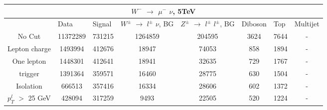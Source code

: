 \documentclass[10pt]{article}
\begin{document}
 										
\begin{center}										
\begin{table}[H] 										
\begin{adjustbox}{width=1\textwidth}								
\begin{tabular}{cccccccc} 									
\\ \hline \hline  										
\multicolumn{8}{c}{$W^{-}$ $\rightarrow$ $\mu^{-}$ $\nu$, 5TeV}  									
\\ \hline \hline                            						
\multicolumn{1}{|c|}{}   & \multicolumn{1}{l|}{Data} & \multicolumn{1}{l|}{Signal} & \multicolumn{1}{l|}{$W^{\pm}$ $\rightarrow$ $l^{\pm}$ $\nu$, BG} & \multicolumn{1}{l|}{$Z^{\pm}$ $\rightarrow$ $l^{\pm}$ $l^{\pm}$, BG} & \multicolumn{1}{l|}{Diboson} & \multicolumn{1}{l|}{Top} & \multicolumn{1}{l|}{Multijet} \\ \hline 
\multicolumn{1}{|c|}{No Cut}  & \multicolumn{1}{c|}{11372289} & \multicolumn{1}{c|}{731215} & \multicolumn{1}{c|}{1264859} & \multicolumn{1}{c|}{204595} & \multicolumn{1}{c|}{3624} & \multicolumn{1}{c|}{7644} & \multicolumn{1}{c|}{-}  \\ \hline 
\multicolumn{1}{|c|}{Lepton charge}  & \multicolumn{1}{c|}{1493994} & \multicolumn{1}{c|}{412676} & \multicolumn{1}{c|}{18947} & \multicolumn{1}{c|}{74053} & \multicolumn{1}{c|}{858} & \multicolumn{1}{c|}{1894} & \multicolumn{1}{c|}{-}  \\ \hline 
\multicolumn{1}{|c|}{One lepton}  & \multicolumn{1}{c|}{1448301} & \multicolumn{1}{c|}{412641} & \multicolumn{1}{c|}{18941} & \multicolumn{1}{c|}{32635} & \multicolumn{1}{c|}{729} & \multicolumn{1}{c|}{1767} & \multicolumn{1}{c|}{-}  \\ \hline 
\multicolumn{1}{|c|}{trigger}  & \multicolumn{1}{c|}{1391364} & \multicolumn{1}{c|}{359571} & \multicolumn{1}{c|}{16460} & \multicolumn{1}{c|}{28775} & \multicolumn{1}{c|}{630} & \multicolumn{1}{c|}{1504} & \multicolumn{1}{c|}{-}  \\ \hline 
\multicolumn{1}{|c|}{Isolation}  & \multicolumn{1}{c|}{666513} & \multicolumn{1}{c|}{357416} & \multicolumn{1}{c|}{16334} & \multicolumn{1}{c|}{28606} & \multicolumn{1}{c|}{602} & \multicolumn{1}{c|}{1372} & \multicolumn{1}{c|}{-}  \\ \hline 
\multicolumn{1}{|c|}{$p_{T}^{l}$ $>$ 25 GeV}  & \multicolumn{1}{c|}{428094} & \multicolumn{1}{c|}{317259} & \multicolumn{1}{c|}{9493} & \multicolumn{1}{c|}{22505} & \multicolumn{1}{c|}{520} & \multicolumn{1}{c|}{1224} & \multicolumn{1}{c|}{-}  \\ \hline 

\end{tabular}
\end{adjustbox}
\end{table}
\end{center}
\end{document}
